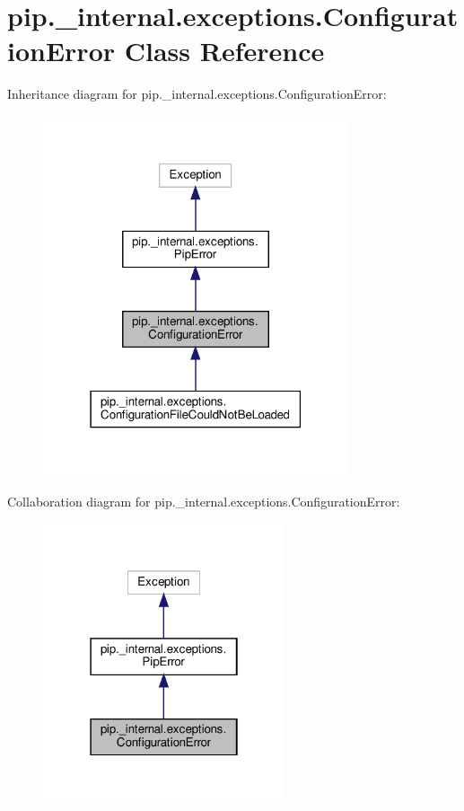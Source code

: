\hypertarget{classpip_1_1__internal_1_1exceptions_1_1ConfigurationError}{}\section{pip.\+\_\+internal.\+exceptions.\+Configuration\+Error Class Reference}
\label{classpip_1_1__internal_1_1exceptions_1_1ConfigurationError}


Inheritance diagram for pip.\+\_\+internal.\+exceptions.\+Configuration\+Error\+:
\nopagebreak
\begin{figure}[H]
\begin{center}
\leavevmode
\includegraphics[width=255pt]{classpip_1_1__internal_1_1exceptions_1_1ConfigurationError__inherit__graph}
\end{center}
\end{figure}


Collaboration diagram for pip.\+\_\+internal.\+exceptions.\+Configuration\+Error\+:
\nopagebreak
\begin{figure}[H]
\begin{center}
\leavevmode
\includegraphics[width=202pt]{classpip_1_1__internal_1_1exceptions_1_1ConfigurationError__coll__graph}
\end{center}
\end{figure}


